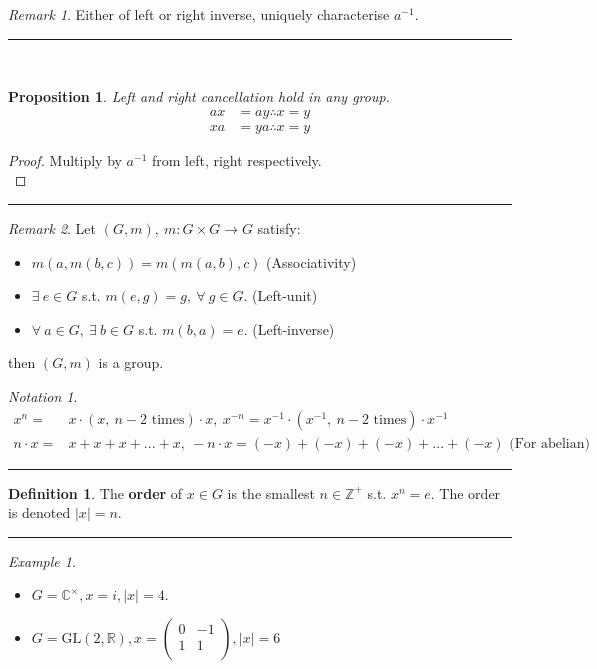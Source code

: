 \documentclass{article}
\newtheorem{theorem}{Proposition}[section]
\theoremstyle{definition}
\newtheorem{definition}{Definition}[section]
\theoremstyle{remark}
\newtheorem*{remark}{Remark}
\newtheorem*{example}{Example}
\newtheorem*{notation}{Notation}
\begin{document}
\begin{remark}
	\vspace{1mm}Either of left or right inverse, uniquely characterise $a^{-1}$.\\
\end{remark}
\hrule
\vspace{3mm}~\\
\begin{theorem}
	Left and right cancellation hold in any group.
	\begin{align}
		ax & =ay\therefore x=y \\
		xa & =ya\therefore x=y
	\end{align}
\end{theorem}
\begin{proof}
	Multiply by $a^{-1}$ from left, right respectively.\\
\end{proof}
\hrule
\begin{remark}
	\vspace{1mm}Let  $(G, m),~m:G\times G \rightarrow G$ satisfy:\\
	\begin{itemize}
		\item $m(a, m(b,c))=m(m(a,b),c)$ (Associativity)
		\item $\exists~e\in G$ s.t. $m(e,g)=g,~\forall~g\in G$. (Left-unit)
		\item $\forall ~ a \in G,~\exists~b\in G$ s.t. $m(b,a)=e$. (Left-inverse)
	\end{itemize}
	then $(G,m)$ is a group.\\
\end{remark}
\begin{notation}
	\begin{align}
		x^n=      & x\cdot (x, ~ n-2 \text{ times}) \cdot x,~x^{-n}=x^{-1}\cdot (x^{-1}, ~ n-2 \text{ times}) \cdot x^{-1} \\
		n\cdot x= & x+x+x+...+x,~-n\cdot x = (-x)+(-x)+(-x)+...+(-x) \text{ (For abelian)}
	\end{align}
\end{notation}
\hrule
\begin{definition}
	The \textbf{order} of $x\in G$ is the smallest $n\in \mathbb{Z}^+$ s.t. $x^n=e$. The order is denoted $|x|= n$.\\
\end{definition}
\hrule
\begin{example}
	\begin{itemize}
		\item $G=\mathbb{C}^{\times}, x=i, |x|=4.$
		\item $G=\mathrm{GL}(2,\mathbb{R}), x=\begin{pmatrix}0&-1\\1&1\\\end{pmatrix}, |x|=6$
	\end{itemize}
\end{example}
\newpage
\end{document}
